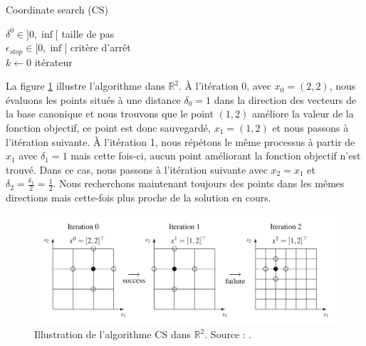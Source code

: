 \documentclass[french]{report}
\begin{document}
\begin{algorithm}[htbp]

    \SetAlgoNoLine
    \caption{Coordinate search (CS)}


    \Indp
    $\delta^0 \in ] 0,\inf [$ \hspace{1cm} taille de pas \\
    $\epsilon_{stop} \in [ 0,\inf [$ \hspace{0.56cm} critère d'arrêt \\
    $k \leftarrow 0$ \hspace{1.73cm} itérateur \\
    \Indm

    \Indp
    \Indm
    \label{algo::CS}
\end{algorithm}

La figure \ref{fig:CS} illustre l'algorithme dans $\mathbb{R}^2$. À l'itération 0, avec $x_0 = (2,2)$, nous évaluons les points situés à une distance $\delta_0 = 1$ dans la direction des vecteurs de la base canonique et nous trouvons que le point $(1,2)$ améliore la valeur de la fonction objectif, ce point est donc sauvegardé, $x_1=(1,2)$ et nous passons à l'itération suivante. À l'itération 1, nous répétons le même processus à partir de $x_1$ avec $\delta_1 = 1$  mais cette fois-ci, aucun point améliorant la fonction objectif n'est trouvé. Dans ce cas, nous passons à l'itération suivante avec $x_2 = x_1$ et $\delta_2 = \frac{\delta_1}{2} = \frac{1}{2}$. Nous recherchons maintenant toujours des points dans les mêmes directions mais cette-fois plus proche de la solution en cours.

\begin{figure}[htbp]
    \centering
    \includegraphics[width=14cm]{CS_algo_illustration.png}
    \caption{Illustration de l'algorithme CS dans $\mathbb{R}^2$. Source : \cite{AuHa2017a}.}
    \label{fig:CS}
\end{figure}
\end{document}

